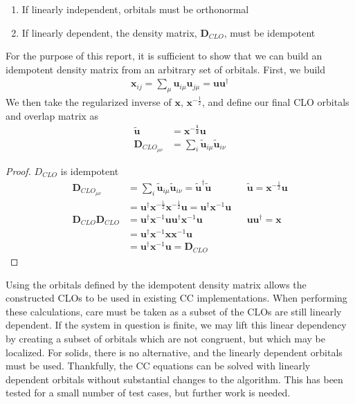 \documentclass[letterpaper, 12pt]{article}
\newcommand{\matr}[1]{\bm{#1}} %
\begin{document}
\begin{enumerate}
\item If linearly independent, orbitals must be orthonormal
\item If linearly dependent, the  density matrix, $\matr{D}_{CLO}$, must be idempotent
\end{enumerate} 
For the purpose of this report, it is sufficient to show that we can build an idempotent density matrix from an arbitrary set of orbitals. First, we build
\begin{align}
\matr{x}_{ij} = \sum_\mu \matr{u}_{i \mu} \matr{u}_{j \mu} = \matr{u} \matr{u}^\dagger
\end{align}
We then take the regularized inverse of $\matr{x}$, $\matr{x}^{-\frac{1}{2}}$, and define our final CLO orbitals and overlap matrix as 
\begin{align}
\matr{\tilde{u}} &= \matr{x^{-\frac{1}{2}}} \matr{u} \label{eq:xij} \\
\matr{D}_{CLO_{\mu \nu}} &= \sum_i \matr{\tilde{u}}_{i \mu} \matr{\tilde{u}}_{i \nu}
\end{align} 
\begin{proof} $D_{CLO}$ is idempotent
\begin{align*}
\matr{D}_{CLO_{\mu \nu}} &= \sum_i \matr{\tilde{u}}_{i \mu} \matr{\tilde{u}}_{i \nu} = \matr{\tilde{u}}^\dagger \matr{\tilde{u}} && \matr{\tilde{u}} = \matr{x}^{-\frac{1}{2}}\matr{u} \\
&= \matr{u}^{\dagger} \matr{x}^{-\frac{1}{2}} \matr{x}^{- \frac{1}{2}}\matr{u} = \matr{u}^{\dagger} \matr{x}^{-1}\matr{u} \\
\matr{D}_{CLO}\matr{D}_{CLO} &= \matr{u}^{\dagger} \matr{x}^{-1}\matr{u} \matr{u}^{\dagger} \matr{x}^{-1}\matr{u}&& \matr{u} \matr{u}^{\dagger} = \matr{x} \\
&=  \matr{u}^{\dagger} \matr{x}^{-1} \matr{x} \matr{x}^{-1}\matr{u}  \\
&= \matr{u}^{\dagger} \matr{x}^{-1} \matr{u} = \matr{D}_{CLO}
\end{align*}
\end{proof}

Using the orbitals defined by the idempotent density matrix allows the constructed CLOs to be used in existing CC implementations. When performing these calculations, care must be taken as a subset of the CLOs are still linearly dependent. If the system in question is finite, we may lift this linear dependency by creating a subset of orbitals which are not congruent, but which may be localized. For solids, there is no alternative, and the linearly dependent orbitals must be used. Thankfully, the CC equations can be solved with linearly dependent orbitals without substantial changes to the algorithm. This has been tested for a small number of test cases, but further work is needed. 
\end{document}
